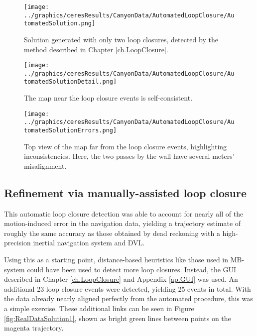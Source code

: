 \begin{figure}[!htb]
   \centering
   \texttt{[image: ../graphics/ceresResults/CanyonData/AutomatedLoopClosure/AutomatedSolution.png]} %
   \caption{Solution generated with only two loop closures, detected by the method described in Chapter \ref{ch.LoopClosure}.}
   \label{fig:AutoSol}
\end{figure}

 \begin{figure}[!htb]
   \centering
   \texttt{[image: ../graphics/ceresResults/CanyonData/AutomatedLoopClosure/AutomatedSolutionDetail.png]} %
   \caption{The map near the loop closure events is self-consistent.}
   \label{fig:AutoSol1}
\end{figure}

 \begin{figure}[!htb]
   \centering
   \texttt{[image: ../graphics/ceresResults/CanyonData/AutomatedLoopClosure/AutomatedSolutionErrors.png]} %
   \caption{Top view of the map far from the loop closure events, highlighting inconsistencies. Here, the two passes by the wall have several meters' misalignment.}
   \label{fig:AutoSol2}
\end{figure}

\subsection{Refinement via manually-assisted loop closure}

This automatic loop closure detection was able to account for nearly all of the motion-induced error in the navigation data, yielding a trajectory estimate of roughly the same accuracy as those obtained by dead reckoning with a high-precision inertial navigation system and DVL. 

Using this as a starting point, distance-based heuristics like those used in MB-system \cite{Caress2006} could have been used to detect more loop closures. Instead, the GUI described in Chapter \ref{ch.LoopClosure} and Appendix \ref{ap.GUI} was used. An additional 23 loop closure events were detected, yielding 25 events in total. With the data already nearly aligned perfectly from the automated procedure, this was a simple exercise. These additional links can be seen in Figure \ref{fig:RealDataSolution1}, shown as bright green lines between points on the magenta trajectory.

